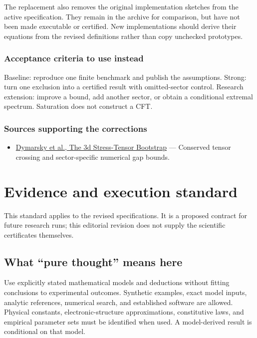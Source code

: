 \documentclass[
  11pt,
]{article}
\providecommand{\tightlist}{%
  \setlength{\itemsep}{0pt}\setlength{\parskip}{0pt}}
\begin{document}
The replacement also removes the original implementation sketches from
the active specification. They remain in the archive for comparison, but
have not been made executable or certified. New implementations should
derive their equations from the revised definitions rather than copy
unchecked prototypes.

\subsubsection{Acceptance criteria to use instead}

Baseline: reproduce one finite benchmark and publish the assumptions.
Strong: turn one exclusion into a certified result with omitted-sector
control. Research extension: improve a bound, add another sector, or
obtain a conditional extremal spectrum. Saturation does not construct a
CFT.

\subsubsection{Sources supporting the corrections}

\begin{itemize}
\tightlist
\item
  \href{https://arxiv.org/abs/1708.05718}{Dymarsky et al., The 3d
  Stress-Tensor Bootstrap} --- Conserved tensor crossing and
  sector-specific numerical gap bounds.
\end{itemize}

\section{Evidence and execution standard}

This standard applies to the revised specifications. It is a proposed
contract for future research runs; this editorial revision does not
supply the scientific certificates themselves.

\subsection{What ``pure thought'' means here}

Use explicitly stated mathematical models and deductions without fitting
conclusions to experimental outcomes. Synthetic examples, exact model
inputs, analytic references, numerical search, and established software
are allowed. Physical constants, electronic-structure approximations,
constitutive laws, and empirical parameter sets must be identified when
used. A model-derived result is conditional on that model.
\end{document}
